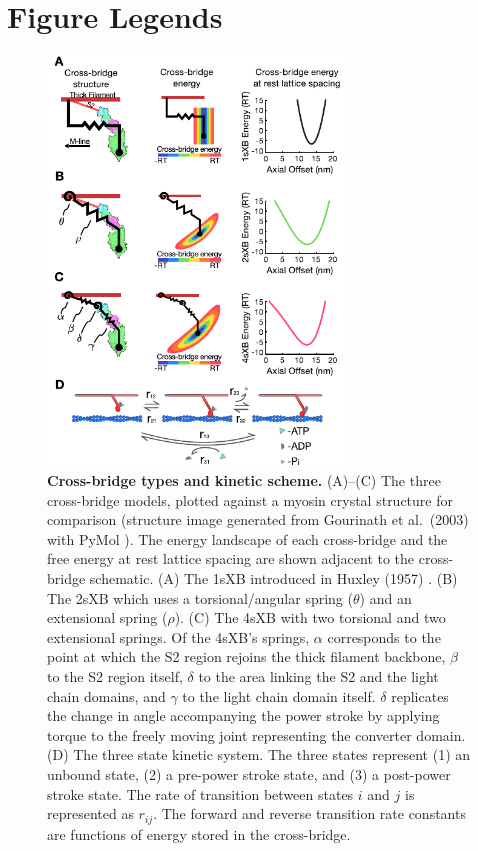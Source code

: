 \documentclass[10pt]{article}
\newcommand{\citep}[1]{\cite{#1}} %
\begin{document}
\clearpage
\section*{Figure Legends} %

\begin{figure}[!ht]
    \begin{center}
    \includegraphics[width=3.1in]{../imgs/fig_xb_types.pdf}
    \caption{ \textbf{Cross-bridge types and kinetic scheme.} 
        (A)--(C) The three cross-bridge models, plotted against a myosin crystal structure for comparison (structure image generated from Gourinath et al.~(2003) \protect\citep{Gourinath2003} with PyMol \protect\citep{pymol}).
        The energy landscape of each cross-bridge and the free energy at rest lattice spacing are shown adjacent to the cross-bridge schematic.
        (A) The 1sXB introduced in Huxley (1957) \protect\citep{Huxley1957}. 
        (B) The 2sXB which uses a torsional/angular spring ($\theta$) and an extensional spring ($\rho$). 
        (C) The 4sXB with two torsional and two extensional springs.
        Of the 4sXB's springs, $\alpha$ corresponds to the point at which the S2 region rejoins the thick filament backbone, $\beta$ to the S2 region itself, $\delta$ to the area linking the S2 and the light chain domains, and $\gamma$ to the light chain domain itself.
        $\delta$ replicates the change in angle accompanying the power stroke by applying torque to the freely moving joint representing the converter domain.
        (D)  The three state kinetic system. 
        The three states represent (1) an unbound state, (2) a pre-power stroke state, and (3) a post-power stroke state. 
        The rate of transition between states $i$ and $j$ is represented as $r_{ij}$. 
        The forward and reverse transition rate constants are functions of energy stored in the cross-bridge. 
        \label{fig_xb_types}
        }
    \end{center}
\end{figure}
\end{document}
